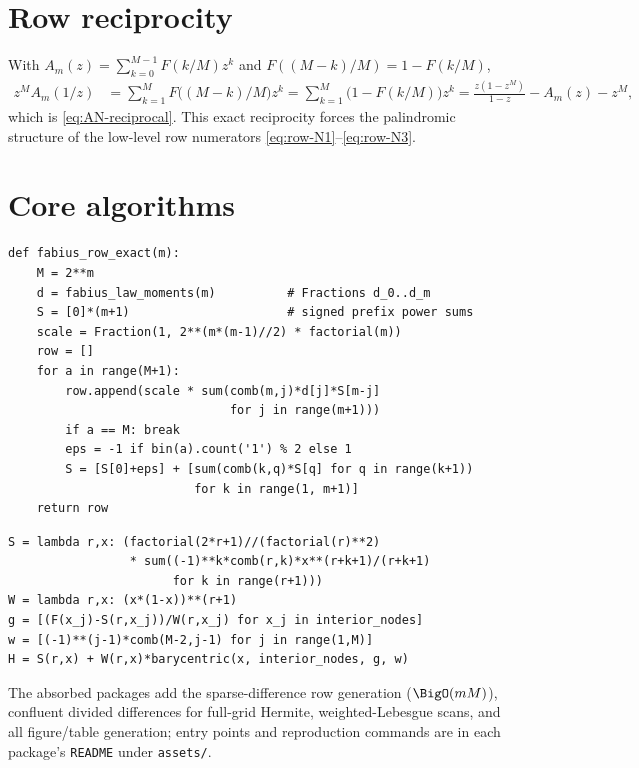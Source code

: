 \documentclass[11pt,oneside]{article}
\numberwithin{equation}{section}
\theoremstyle{definition}
\theoremstyle{remark}
\begin{document}
\section{Row reciprocity}
\label{app:row-symmetry}

With $A_m(z)=\sum_{k=0}^{M-1}F(k/M)z^{k}$ and
$F((M-k)/M)=1-F(k/M)$,
\begin{align}
 z^{M}A_m(1/z)
 &=\sum_{k=1}^{M}F\bigl((M-k)/M\bigr)z^{k}
 =\sum_{k=1}^{M}\bigl(1-F(k/M)\bigr)z^{k}
 =\frac{z(1-z^{M})}{1-z}-A_m(z)-z^{M},
\end{align}
which is \eqref{eq:AN-reciprocal}.  This exact reciprocity forces the
palindromic structure of the low-level row numerators
\eqref{eq:row-N1}--\eqref{eq:row-N3}.

\section{Core algorithms}
\label{app:algorithms}

\begin{lstlisting}[style=pythonstyle,caption={Streaming the exact
dyadic Fabius row (\cref{alg:stream}); \texttt{d} holds the exact
Fabius-law moments of \eqref{eq:d-recurrence}.}]
def fabius_row_exact(m):
    M = 2**m
    d = fabius_law_moments(m)          # Fractions d_0..d_m
    S = [0]*(m+1)                      # signed prefix power sums
    scale = Fraction(1, 2**(m*(m-1)//2) * factorial(m))
    row = []
    for a in range(M+1):
        row.append(scale * sum(comb(m,j)*d[j]*S[m-j]
                               for j in range(m+1)))
        if a == M: break
        eps = -1 if bin(a).count('1') % 2 else 1
        S = [S[0]+eps] + [sum(comb(k,q)*S[q] for q in range(k+1))
                          for k in range(1, m+1)]
    return row
\end{lstlisting}

\begin{lstlisting}[style=pythonstyle,caption={Endpoint-flat
interpolation in barycentric form (\cref{thm:factorization}).}]
S = lambda r,x: (factorial(2*r+1)//(factorial(r)**2)
                 * sum((-1)**k*comb(r,k)*x**(r+k+1)/(r+k+1)
                       for k in range(r+1)))
W = lambda r,x: (x*(1-x))**(r+1)
g = [(F(x_j)-S(r,x_j))/W(r,x_j) for x_j in interior_nodes]
w = [(-1)**(j-1)*comb(M-2,j-1) for j in range(1,M)]
H = S(r,x) + W(r,x)*barycentric(x, interior_nodes, g, w)
\end{lstlisting}

The absorbed packages add the sparse-difference row generation
($\BigO(mM)$), confluent divided differences for full-grid Hermite,
weighted-Lebesgue scans, and all figure/table generation; entry
points and reproduction commands are in each package's
\nolinkurl{README} under \nolinkurl{assets/}.
\end{document}
